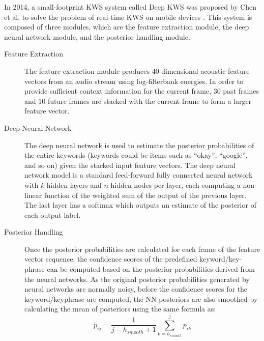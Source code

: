         In 2014, a small-footprint KWS system called Deep KWS was proposed by Chen et al. to solve the problem of real-time KWS on mobile devices \cite{CPH14}.
        This system is composed of three modules, which are the feature extraction module, the deep neural network module, and the posterior handling module.
        \begin{description}
            \item[Feature Extraction] The feature extraction module produces 40-dimensional acoustic feature vectors from an audio stream using log-filterbank energies. 
            In order to provide sufficient context information for the current frame, 30 past frames and 10 future frames are stacked with the current frame to form a larger feature vector.

            \item[Deep Neural Network] The deep neural network is used to estimate the posterior probabilities of the entire keywords (keywords could be items such as ``okay'', ``google'', and so on) given the stacked input feature vectors.
            The deep neural network model is a standard feed-forward fully connected neural network with $k$ hidden layers and $n$ hidden nodes per layer, each computing a non-linear function of the weighted sum of the output of the previous layer. 
            The last layer has a softmax which outputs an estimate of the posterior of each output label.

            \item[Posterior Handling] Once the posterior probabilities are calculated for each frame of the feature vector sequence, the confidence scores of the predefined keyword/key-phrase can be computed based on the posterior probabilities derived from the neural networks.
            As the original posterior probabilities generated by neural networks are normally noisy, before the confidence scores for the keyword/keyphrase are computed, the NN posteriors are also smoothed by calculating the mean of posteriors using the same formula as:
            \begin{equation}
                \bar{p}_{ij} =\frac{1}{j-h_{smooth}+1} \sum_{k=h_{smooth}}^{j}{p_{ik}} 
            \end{equation}


\end{description}
